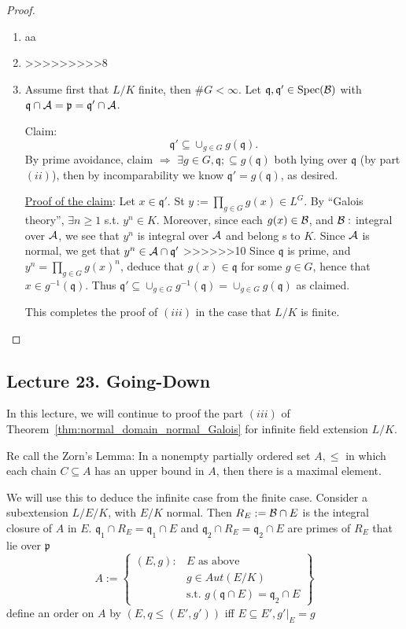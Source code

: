 \documentclass[11pt]{article}
\newcommand{\scp}{{\mathfrak p}}
\newcommand{\scq}{\mathfrak q}
\newcommand{\cala}{{\cal A}}
\newcommand{\calb}{{\cal B}}
\newcommand{\Lrta}{\Longrightarrow}
\begin{document}
\begin{proof}
\begin{enumerate}[label=(\roman*)]
\item aa
\item 
>>>>>>>>>8
\item Assume first that $L/K$ finite, then $\#G<\infty$. Let $\scq,\scq'\in \text{Spec}(\calb)$ with $\scq\cap\cala=\scp=\scq'\cap\cala$. 

Claim:
$$
\scq'\subseteq\cup_{g\in G}g(\scq).
$$
By prime avoidance, claim $\Lrta$ $\exists g\in G,\scq;\subseteq g(\scq)$ both lying over $\scq$ (by part $(ii)$), then by incomparability we know $\scq'=g(\scq)$, as desired.

\underline{Proof of the claim}: Let $x\in \scq'.$ St $y:=\prod_{g\in G}g(x)\in L^G$.
By ``Galois theory'', $\exists n\geq 1$ s.t. $y^n\in K$. Moreover, since each $g(x)\in\calb$, and $\calb:$ integral over $\cala$, we see that $y^n$ is integral over $\cala$ and belong s to $K$. Since $\cala$ is normal, we get that $y^n\in \cala\cap\scq'$
>>>>>>10
Since $\scq$ is prime, and $y^n=\prod_{g\in G}g(x)^n$, deduce that $g(x)\in\scq$ for some $g\in G$, hence that $x\in g^{-1}(\scq)$. Thus $\scq'\subseteq \cup_{g\in G}g^{-1}(\scq)=\cup_{g\in G}g(\scq)$ as claimed.

This completes the proof of $(iii)$ in the case that $L/K$ is finite.
\end{enumerate}
\end{proof}

\subsection{Lecture 23. Going-Down}
In this lecture, we will continue to proof the part $(iii)$ of Theorem~\ref{thm:normal_domain_normal_Galois} for infinite field extension $L/K$.

Re call the Zorn's Lemma: In a nonempty partially ordered set $A,\leq $ in which each chain $C\subseteq A$ has an upper bound in $A$, then there is a maximal element.

We will use this to deduce the infinite case from the finite case. Consider a subextension $L/E/K$, with $E/K$ normal. Then $R_E:=\calb\cap E$ is the integral closure of $A$ in $E$. $\scq_1\cap R_E=\scq_1\cap E$ and $\scq_2\cap R_E=\scq_2\cap E$ are primes of $R_E$ that lie over $\scp$
$$
A:=\left\{
\begin{aligned}
(E,g):& E \text{ as above }\\
& g\in Aut(E/K)\\
&\text{s.t. } g(\scq\cap E)=\scq_2\cap E
\end{aligned}
\right\}
$$
define an order on $A$ by $(E,q\leq (E',g'))$ iff $E\subseteq E', g'|_E=g$
\end{document}

